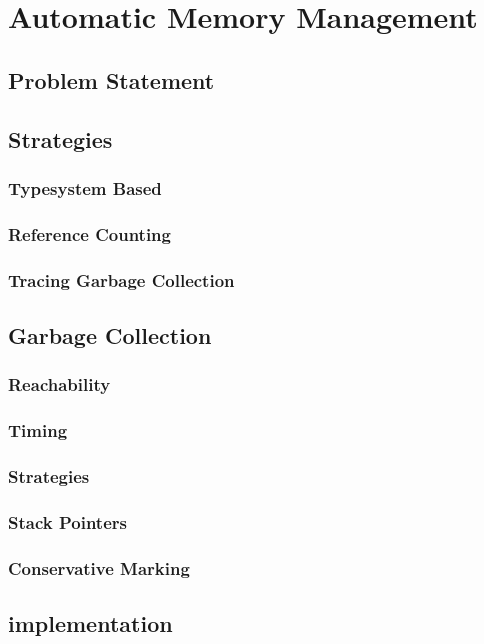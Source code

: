 \chapter{Automatic Memory Management}

\section{Problem Statement}
\section{Strategies}
\subsection{Typesystem Based}
\subsection{Reference Counting}
\subsection{Tracing Garbage Collection}

\section{Garbage Collection}
\subsection{Reachability}
\subsection{Timing}
\subsection{Strategies}
\subsection{Stack Pointers}
\subsection{Conservative Marking}

\section{\Rift implementation}
